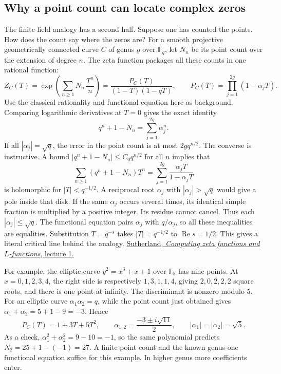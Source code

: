 \documentclass[11pt,letterpaper]{article}
\renewcommand{\Re}{\operatorname{Re}}
\begin{document}
\subsection{Why a point count can locate complex zeros}

The finite-field analogy has a second half. Suppose one has counted the points. How does the count say where the zeros are? For a smooth projective geometrically connected curve \(C\) of genus \(g\) over \(\mathbb F_q\), let \(N_n\) be its point count over the extension of degree \(n\). The zeta function packages all these counts in one rational function:
\[
 Z_C(T)=\exp\!\left(\sum_{n\ge1}N_n\,\frac{T^n}{n}\right)
     =\frac{P_C(T)}{(1-T)(1-qT)},\qquad
 P_C(T)=\prod_{j=1}^{2g}(1-\alpha_jT).
\]
Use the classical rationality and functional equation here as background. Comparing logarithmic derivatives at \(T=0\) gives the exact identity
\[
                       q^n+1-N_n=\sum_{j=1}^{2g}\alpha_j^n .
\]
If all \(|\alpha_j|=\sqrt q\), the error in the point count is at most \(2gq^{n/2}\). The converse is instructive. A bound \(|q^n+1-N_n|\le C_0 q^{n/2}\) for all \(n\) implies that
\[
  \sum_{n\ge1}(q^n+1-N_n)T^n
         =\sum_{j=1}^{2g}\frac{\alpha_jT}{1-\alpha_jT}
\]
is holomorphic for \(|T|<q^{-1/2}\). A reciprocal root \(\alpha_j\) with \(|\alpha_j|>\sqrt q\) would give a pole inside that disk. If the same \(\alpha_j\) occurs several times, its identical simple fraction is multiplied by a positive integer. Its residue cannot cancel. Thus each \(|\alpha_j|\le\sqrt q\). The functional equation pairs \(\alpha_j\) with \(q/\alpha_j\), so all these inequalities are equalities. Substitution \(T=q^{-s}\) takes \(|T|=q^{-1/2}\) to \(\Re s=1/2\). This gives a literal critical line behind the analogy. \href{https://math.mit.edu/~drew/BristolLecture1.pdf}{Sutherland, \emph{Computing zeta functions and \(L\)-functions}, lecture 1.}

For example, the elliptic curve \(y^2=x^3+x+1\) over \(\mathbb F_5\) has nine points. At \(x=0,1,2,3,4\), the right side is respectively \(1,3,1,1,4\), giving \(2,0,2,2,2\) square roots, and there is one point at infinity. The discriminant is nonzero modulo 5. For an elliptic curve \(\alpha_1\alpha_2=q\), while the point count just obtained gives \(\alpha_1+\alpha_2=5+1-9=-3\). Hence
\[
   P_C(T)=1+3T+5T^2,\qquad
   \alpha_{1,2}=\frac{-3\pm i\sqrt{11}}{2},\qquad
   |\alpha_1|=|\alpha_2|=\sqrt5 .
\]
As a check, \(\alpha_1^2+\alpha_2^2=9-10=-1\), so the same polynomial predicts \(N_2=25+1-(-1)=27\). A finite point count and the known genus-one functional equation suffice for this example. In higher genus more coefficients enter.
\end{document}
